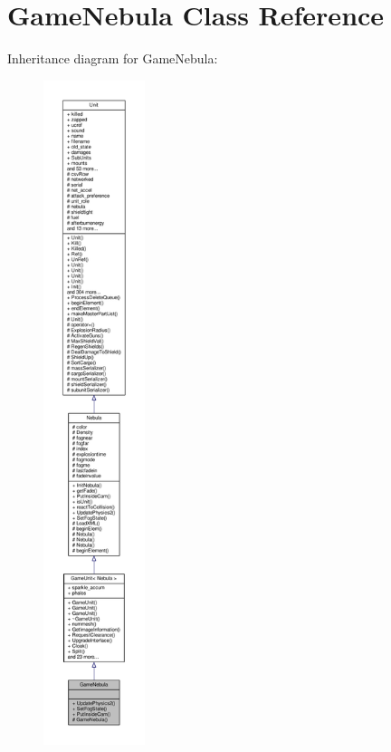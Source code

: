 \hypertarget{classGameNebula}{}\section{Game\+Nebula Class Reference}
\label{classGameNebula}


Inheritance diagram for Game\+Nebula\+:
\nopagebreak
\begin{figure}[H]
\begin{center}
\leavevmode
\includegraphics[height=550pt]{d1/dcc/classGameNebula__inherit__graph}
\end{center}
\end{figure}


